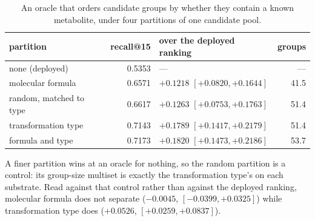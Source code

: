 \begin{table}[h]
\centering\small
\begin{threeparttable}
\caption{An oracle that orders candidate groups by whether they contain a known metabolite, under four partitions of one candidate pool.}
\label{tab:si-oracle}
\begin{tabular}{lrlr}
\toprule
partition & recall@15 & over the deployed ranking & groups \\
\midrule
none (deployed) & 0.5353 & --- & --- \\
molecular formula & 0.6571 & $+0.1218$ $[+0.0820, +0.1644]$ & 41.5 \\
random, matched to type & 0.6617 & $+0.1263$ $[+0.0753, +0.1763]$ & 51.4 \\
transformation type & 0.7143 & $+0.1789$ $[+0.1417, +0.2179]$ & 51.4 \\
formula and type & 0.7173 & $+0.1820$ $[+0.1473, +0.2186]$ & 53.7 \\
\bottomrule
\end{tabular}
\begin{tablenotes}[flushleft]\footnotesize
\item A finer partition wins at an oracle for nothing, so the random partition is a control: its group-size multiset is exactly the transformation type's on each substrate. Read against that control rather than against the deployed ranking, molecular formula does not separate ($-0.0045$, $[-0.0399, +0.0325]$) while transformation type does ($+0.0526$, $[+0.0259, +0.0837]$).
\end{tablenotes}
\end{threeparttable}
\end{table}
